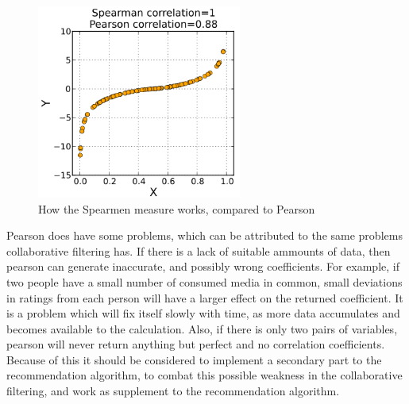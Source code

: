 \begin{figure}[htb]
\centering
\includegraphics[width=0.6\textwidth]{Images/spearman.png}
\caption{How the Spearmen measure works, compared to Pearson}
\label{Spearman}
\end{figure}

Pearson does have some problems, which can be attributed to the same problems collaborative filtering has. If there is a lack of suitable ammounts of data, then pearson can generate inaccurate, and possibly wrong coefficients. For example, if two people have a small number of consumed media in common, small deviations in ratings from each person will have a larger effect on the returned coefficient. It is a problem which will fix itself slowly with time, as more data accumulates and becomes available to the calculation. Also, if there is only two pairs of variables, pearson will never return anything but perfect and no correlation coefficients. Because of this it should be considered to implement a secondary part to the recommendation algorithm, to combat this possible weakness in the collaborative filtering, and work as supplement to the recommendation algorithm.
